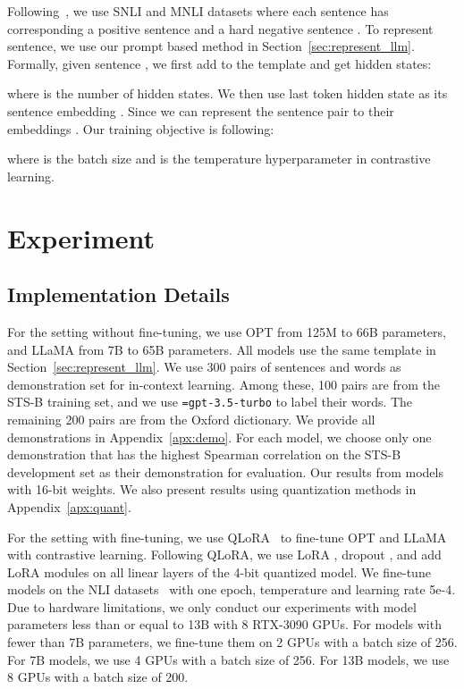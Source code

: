 \documentclass{article}
\newcommand{\hytt}[1]{\texttt{\hyphenchar \font=\defaulthyphenchar#1}}
\begin{document}
Following~\cite{gao2021simcse}, we use SNLI and MNLI datasets where each sentence  has corresponding a positive sentence  and a hard negative sentence . To represent sentence, we use our prompt based method in Section~\ref{sec:represent_llm}.
Formally, given sentence , we first add  to the template and get hidden states:



where  is the number of hidden states. We then use last token hidden state as its sentence embedding .
Since we can represent the sentence pair  to their embeddings .
Our training objective is following:



where  is the batch size and  is the temperature hyperparameter in contrastive learning.


\section{Experiment}
\subsection{Implementation Details}
For the setting without fine-tuning, we use OPT from 125M to 66B parameters, and LLaMA from 7B to 65B parameters.
All models use the same template in Section~\ref{sec:represent_llm}.
 We use 300 pairs of sentences and words as demonstration set for in-context learning. Among these, 100 pairs are from the STS-B training set, and we use \hytt{gpt-3.5-turbo} to label their words. The remaining 200 pairs are from the Oxford dictionary. We provide all demonstrations in Appendix~\ref{apx:demo}.
For each model, we choose only one demonstration that has the highest Spearman correlation on the STS-B development set as their demonstration for evaluation.
Our results from models with 16-bit weights. We also present results using quantization methods in Appendix~\ref{apx:quant}.

For the setting with fine-tuning,
we use QLoRA~\cite{dettmers2023qlora} to fine-tune OPT and LLaMA with contrastive learning.
Following QLoRA, we use LoRA , dropout , and add LoRA modules on all linear layers of the 4-bit quantized model.
We fine-tune models on the NLI datasets~\cite{gao2021simcse} with one epoch, temperature  and learning rate 5e-4.
Due to hardware limitations, we only conduct our experiments with model parameters less than or equal to 13B with 8 RTX-3090 GPUs.
For models with fewer than 7B parameters, we fine-tune them on 2 GPUs with a batch size of 256. For 7B models, we use 4 GPUs with a batch size of 256. For 13B models, we use 8 GPUs with a batch size of 200.
\end{document}
